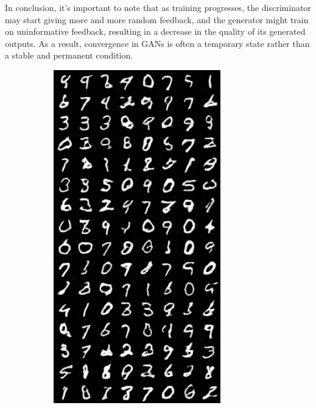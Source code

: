 In conclusion, it's important to note that as training progresses, the discriminator may start giving more and more random feedback, and the generator might train on uninformative feedback, resulting in a decrease in the quality of its generated outputs. As a result, convergence in GANs is often a temporary state rather than a stable and permanent condition.

\begin{figure}[!htbp]
    \centering

    \begin{subfigure}{0.2\textwidth}
        \centering
        \includegraphics[width=0.95\linewidth]{longer_epochs/fake_sample_epoch_0010.png}

\end{subfigure}
\end{figure}
